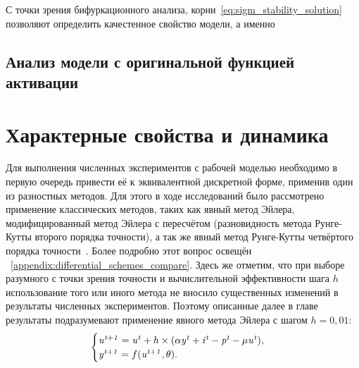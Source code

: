 
С точки зрения бифуркационного анализа, корни~\eqref{eq:sigm_stability_solution} позволяют определить качестенное свойство модели, а именно


\newpage
{}

\newpage
{}


\subsection{Анализ модели с оригинальной функцией активации}


\section{Характерные свойства и динамика} \label{section:neuron_dynamic}

Для выполнения численных экспериментов с рабочей моделью необходимо в первую очередь привести её к эквивалентной дискретной форме, применив один из разностных методов. Для этого в ходе исследований было рассмотрено применение классических методов, таких как явный метод Эйлера, модифицированный метод Эйлера с пересчётом (разновидность метода Рунге-Кутты второго порядка точности), а так же явный метод Рунге-Кутты четвёртого порядка точности~\cite{Hairer1990}. Более подробно этот вопрос освещён \inappendix~\ref{appendix:differential_schemes_compare}. Здесь же отметим, что при выборе разумного с точки зрения точности и вычислительной эффективности шага $h$ использование того или иного метода не вносило существенных изменений в результаты численных экспериментов. Поэтому описанные далее в главе результаты подразумевают применение явного метода Эйлера с шагом $h = 0,01$:
\begin{equation*}
    \begin{cases}
        \mathit{u^{t+1}} = \mathit{u^{t}} + h \times ( \alpha\mathit{y^{t}} + \mathit{i^{t}} - \mathit{p^{t}} - \mu\mathit{u^{t}} ), \\ 
        \mathit{y^{t+1}} = f(\mathit{u^{t+1}}, \theta).
    \end{cases}
\end{equation*}


